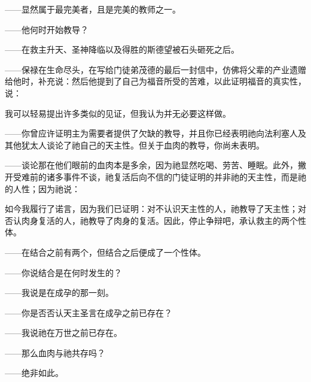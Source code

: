 ——显然属于最完美者，且是完美的教师之一。\par

——他何时开始教导？\par

——在救主升天、圣神降临以及得胜的斯德望被石头砸死之后。\par

——保禄在生命尽头，在写给门徒弟茂德的最后一封信中，仿佛将父辈的产业遗赠给他时，补充说：然后他提到了自己为福音所受的苦难，以此证明福音的真实性，说：\par

我可以轻易提出许多类似的见证，但我认为并无必要这样做。\par

——你曾应许证明主为需要者提供了欠缺的教导，并且你已经表明祂向法利塞人及其他犹太人谈论了祂自己的天主性。但关于血肉的教导，你尚未表明。\par

——谈论那在他们眼前的血肉本是多余，因为祂显然吃喝、劳苦、睡眠。此外，撇开受难前的诸多事件不谈，祂复活后向不信的门徒证明的并非祂的天主性，而是祂的人性；因为祂说：\par

如今我履行了诺言，因为我们已证明：对不认识天主性的人，祂教导了天主性；对否认肉身复活的人，祂教导了肉身的复活。因此，停止争辩吧，承认救主的两个性体。\par

——在结合之前有两个，但结合之后便成了一个性体。\par

——你说结合是在何时发生的？\par

——我说是在成孕的那一刻。\par

——你是否否认天主圣言在成孕之前已存在？\par

——我说祂在万世之前已存在。\par

——那么血肉与祂共存吗？\par

——绝非如此。\par


